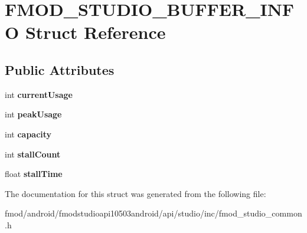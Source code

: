 \hypertarget{struct_f_m_o_d___s_t_u_d_i_o___b_u_f_f_e_r___i_n_f_o}{\section{F\+M\+O\+D\+\_\+\+S\+T\+U\+D\+I\+O\+\_\+\+B\+U\+F\+F\+E\+R\+\_\+\+I\+N\+F\+O Struct Reference}
\label{struct_f_m_o_d___s_t_u_d_i_o___b_u_f_f_e_r___i_n_f_o}
}
\subsection*{Public Attributes}
\begin{DoxyCompactItemize}
\item 
\hypertarget{struct_f_m_o_d___s_t_u_d_i_o___b_u_f_f_e_r___i_n_f_o_ad9e528e0dcf944158302c30cac24fad1}{int {\bfseries current\+Usage}}\label{struct_f_m_o_d___s_t_u_d_i_o___b_u_f_f_e_r___i_n_f_o_ad9e528e0dcf944158302c30cac24fad1}

\item 
\hypertarget{struct_f_m_o_d___s_t_u_d_i_o___b_u_f_f_e_r___i_n_f_o_a2ba32a611c35dccf6156a35e0e47f351}{int {\bfseries peak\+Usage}}\label{struct_f_m_o_d___s_t_u_d_i_o___b_u_f_f_e_r___i_n_f_o_a2ba32a611c35dccf6156a35e0e47f351}

\item 
\hypertarget{struct_f_m_o_d___s_t_u_d_i_o___b_u_f_f_e_r___i_n_f_o_a63efb4c5c498355dc8270a9eb6a26d48}{int {\bfseries capacity}}\label{struct_f_m_o_d___s_t_u_d_i_o___b_u_f_f_e_r___i_n_f_o_a63efb4c5c498355dc8270a9eb6a26d48}

\item 
\hypertarget{struct_f_m_o_d___s_t_u_d_i_o___b_u_f_f_e_r___i_n_f_o_a115b1d0bd33ad3bdc7d0eeb1cca285f7}{int {\bfseries stall\+Count}}\label{struct_f_m_o_d___s_t_u_d_i_o___b_u_f_f_e_r___i_n_f_o_a115b1d0bd33ad3bdc7d0eeb1cca285f7}

\item 
\hypertarget{struct_f_m_o_d___s_t_u_d_i_o___b_u_f_f_e_r___i_n_f_o_a0823d5ad8f87c85b85c758ac510dfe72}{float {\bfseries stall\+Time}}\label{struct_f_m_o_d___s_t_u_d_i_o___b_u_f_f_e_r___i_n_f_o_a0823d5ad8f87c85b85c758ac510dfe72}

\end{DoxyCompactItemize}


The documentation for this struct was generated from the following file\+:\begin{DoxyCompactItemize}
\item 
fmod/android/fmodstudioapi10503android/api/studio/inc/fmod\+\_\+studio\+\_\+common.\+h\end{DoxyCompactItemize}
